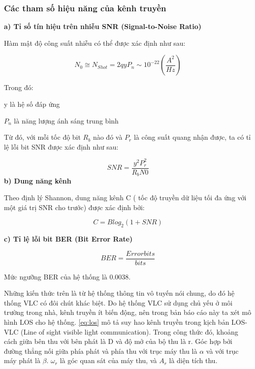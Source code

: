 \subsubsection{Các tham số hiệu năng của kênh truyền}

\textbf{a) Tỉ số tín hiệu trên nhiễu SNR (Signal-to-Noise Ratio)}

Hàm mật độ công suất nhiễu có thể được xác định như sau:

\begin{equation}
	N_{0}\cong N_{Shot}=2qyP_{n}\sim10^{-22}(\dfrac{A^2}{Hz})
\end{equation}

Trong đó:

y là hệ số đáp ứng

$P_{n}$ là năng lượng ánh sáng trung bình

Từ đó, với mỗi tốc độ bit $R_{b}$ nào đó và $P_{r}$ là công suất quang nhận được, ta có tỉ lệ lỗi bit SNR được xác định như sau:

\begin{equation}
	SNR=\dfrac{y^2P_{r}^2}{R_{b}N{0}}
\end{equation}
\vspace{\baselineskip}
\textbf{b) Dung năng kênh}

Theo định lý Shannon, dung năng kênh C ( tốc độ truyền dữ liệu tối đa ứng với một giá trị SNR cho trước) được xác định bởi:

\begin{equation}
	C=Blog_2(1+SNR)
\end{equation}

\textbf{c) Tỉ lệ lỗi bit BER (Bit Error Rate)}



\begin{equation}
	BER=\dfrac{Error bits}{bits}
\end{equation}

Mức ngưỡng BER của hệ thống là 0.0038.

Những kiến thức trên là từ hệ thống thông tin vô tuyến nói chung, do đó hệ thống VLC có đôi chút khác
biệt. Do hệ thống VLC sử dụng chủ yếu ở môi trường trong nhà, kênh truyền ít biến động, nên trong bản báo cáo
này ta xét mô hình LOS cho hệ thống. \eqref{eq:los} mô tả suy hao kênh truyền trong kịch bản LOS-VLC
(Line of sight visible light communication). Trong công thức đó, khoảng cách giữa bên thu với bên phát là D và độ
mở của bộ thu là r. Góc hợp bởi đường thẳng nối giữa phía phát và phía thu với trục máy thu là $\alpha$ và với trục máy
phát là $\beta$. $\omega_r$ là góc quan sát của máy thu, và $A_r$ là diện tích thu.


